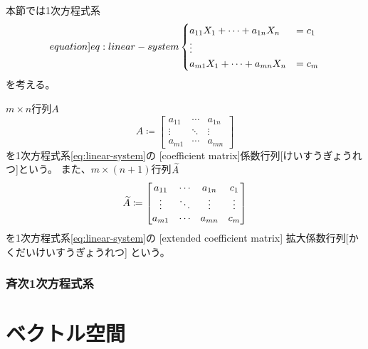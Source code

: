 \documentclass[report]{jlreq}
\begin{document}
本節では1次方程式系
\begin{equation}
    \label[equation]{eq:linear-system}
    \begin{cases}
        a_{11} X_1 + \cdots + a_{1n} X_n &= c_1 \\
        \vdots \\
        a_{m1} X_1 + \cdots + a_{mn} X_n &= c_m
    \end{cases}
\end{equation}
を考える。

\begin{definition}[係数行列]
    $m \times n$行列$A$
    \begin{equation}
        A \coloneqq \begin{bmatrix}
            a_{11} & \cdots & a_{1n} \\
            \vdots & \ddots & \vdots \\
            a_{m1} & \cdots & a_{mn}
        \end{bmatrix}
    \end{equation}
    を1次方程式系\cref{eq:linear-system}の
    [coefficient matrix]{係数行列}[けいすうぎょうれつ]という。
    また、$m \times (n + 1)$行列$\widetilde{A}$
    \begin{equation}
        \widetilde{A} \coloneqq \begin{bmatrix}
            a_{11} & \cdots & a_{1n} & c_1 \\
            \vdots & \ddots & \vdots & \vdots \\
            a_{m1} & \cdots & a_{mn} & c_m
        \end{bmatrix}
    \end{equation}
    を1次方程式系\cref{eq:linear-system}の
    [extended coefficient matrix]
        {拡大係数行列}[かくだいけいすうぎょうれつ]
    という。
\end{definition}

\subsection{斉次1次方程式系}

\TODO{}



%
\chapter{ベクトル空間}
\end{document}
